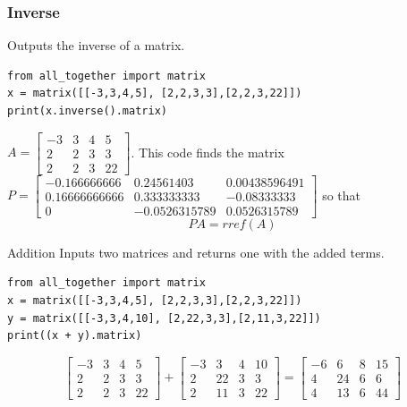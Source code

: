 \documentclass{beamer}
\begin{document}
\begin{frame}[fragile = singleslide]\frametitle{Inverse}
Outputs the inverse of a matrix.
\begin{verbatim}
from all_together import matrix
x = matrix([[-3,3,4,5], [2,2,3,3],[2,2,3,22]])
print(x.inverse().matrix) 
\end{verbatim}
\(A = \left[ \begin{array}{cccc} -3&3&4&5 \\ 2&2&3&3 \\ 2&2&3&22 \end{array}\right]\). This code finds the matrix \\ \(P = \left[ \begin{array}{cccc} -0.166666666&0.24561403&0.00438596491 \\ 0.16666666666&0.333333333&-0.08333333 \\ 0&-0.0526315789&0.0526315789 \end{array}\right]\) so that 
\begin{equation*}
     PA = rref(A) 
\end{equation*}
\end{frame}

\begin{frame}[fragile = singleslide]{Addition}
Inputs two matrices and returns one with the added terms.
\begin{verbatim}
from all_together import matrix
x = matrix([[-3,3,4,5], [2,2,3,3],[2,2,3,22]])
y = matrix([[-3,3,4,10], [2,22,3,3],[2,11,3,22]])
print((x + y).matrix) 
\end{verbatim}
\begin{equation*}
    \left[
    \begin{array}{cccc}
    -3 & 3 & 4 &5   \\
     2&2&3&3 \\
     2&2&3&22
    \end{array}
    \right]
    +
    \left[
    \begin{array}{cccc}
    -3 & 3 & 4 &10   \\
     2&22&3&3 \\
     2&11&3&22
    \end{array}
    \right]
    =
    \left[
    \begin{array}{cccc}
        -6 & 6&8&15 \\
        4 &24&6&6\\
        4&13&6&44
    \end{array}
    \right]
\end{equation*}
\end{frame}
\end{document}
